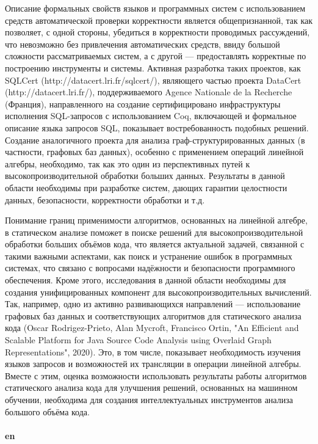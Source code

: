 \documentclass[12pt]{article}  %
\theoremstyle{remark}
\begin{document}
Описание формальных свойств языков и программных систем с использованием средств автоматической проверки корректности является общепризнанной, так как позволяет, с одной стороны, убедиться в корректности проводимых рассуждений, что невозможно без привлечения автоматических средств, ввиду большой сложности рассматриваемых систем, а с другой --- предоставлять корректные по построению инструменты и системы. Активная разработка таких проектов, как SQLCert (http://datacert.lri.fr/sqlcert/), являющего частью проекта DataCert (http://datacert.lri.fr/), поддерживаемого Agence Nationale de la Recherche (Франция), направленного на создание сертифицировано инфраструктуры исполнения SQL-запросов с использованием Coq, включающей и формальное описание языка запросов SQL, показывает востребованность подобных решений. Создание аналогичного проекта для анализа граф-структурированных данных (в частности, графовых баз данных), особенно с применением операций линейной алгебры, необходимо, так как это один из перспективных путей к высокопроизводительной обработки больших данных. Результаты в данной области необходимы при разработке систем, дающих гарантии целостности данных, безопасности, корректности обработки и т.д.

Понимание границ применимости алгоритмов, основанных на линейной алгебре, в статическом анализе поможет в поиске решений для высокопроизводительной обработки больших объёмов кода, что является актуальной задачей, связанной с такими важными аспектами, как поиск и устранение ошибок в программных системах, что связано с вопросами надёжности и безопасности программного обеспечения. Кроме этого, исследования в данной области необходимы для создания унифицированных компонент для высокопроизводительных вычислений. Так, например, одно из активно развивающихся направлений --- использование графовых баз данных и соответствующих алгоритмов для статического анализа кода (Oscar Rodrigez-Prieto, Alan Mycroft, Francisco Ortin, "An Efficient and Scalable Platform for Java Source Code Analysis using Overlaid Graph Representations", 2020). Это, в том числе, показывает необходимость изучения языков запросов и возможностей их трансляции в операции линейной алгебры.
Вместе с этим, оценка возможности использовать результаты работы алгоритмов статического анализа кода для улучшения решений, основанных на машинном обучении, необходима для создания интеллектуальных инструментов анализа большого объёма кода.
\\
\\
\textbf{en}\\
\end{document}
